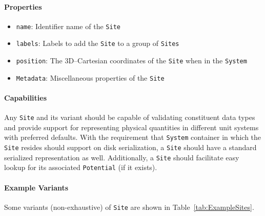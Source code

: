 \documentclass[12pt]{article}
\begin{document}
\paragraph{Properties}
\begin{itemize}
    \item \texttt{name}: Identifier name of the \texttt{Site}
    \item \texttt{labels}: Labels to add the \texttt{Site} to a group of \texttt{Sites}
    \item \texttt{position}: The 3D--Cartesian coordinates of the \texttt{Site} when in the \texttt{System}
    \item \texttt{Metadata}: Miscellaneous properties of the \texttt{Site}
\end{itemize}
\paragraph{Capabilities}
Any \texttt{Site} and its variant should be capable of validating constituent data types and provide support for representing physical quantities in different unit systems with preferred defaults. With the requirement that \texttt{System} container in which the \texttt{Site} resides should support on disk serialization, a \texttt{Site} should have a standard serialized representation as well. Additionally, a \texttt{Site} should facilitate easy lookup for its associated \texttt{Potential} (if it exists).

\paragraph{Example Variants} Some variants (non-exhaustive) of \texttt{Site} are shown in Table~\ref{tab:ExampleSites}.
\end{document}
